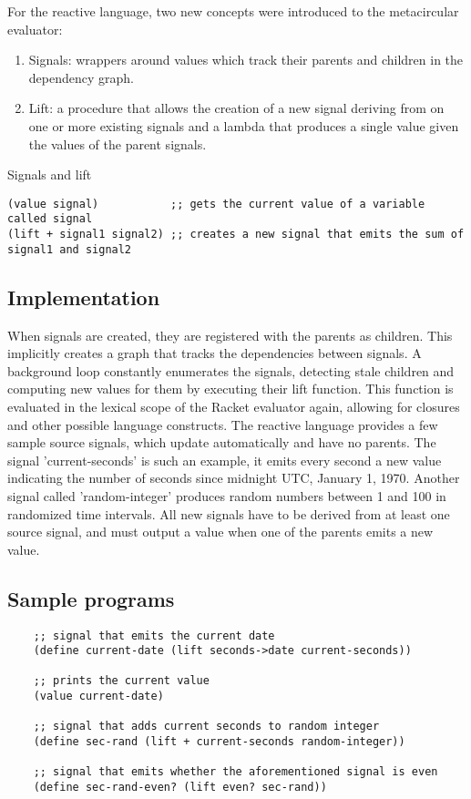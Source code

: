 For the reactive language, two new concepts were introduced to the metacircular evaluator:

\begin{enumerate}
	\item Signals: wrappers around values which track their parents and children in the dependency graph. 
	\item Lift: a procedure that allows the creation of a new signal deriving from on one or more existing signals and a lambda that produces a single value given the values of the parent signals.
\end{enumerate}

Signals and lift
\begin{lstlisting}
(value signal)           ;; gets the current value of a variable called signal
(lift + signal1 signal2) ;; creates a new signal that emits the sum of signal1 and signal2
\end{lstlisting}

\newpage
\subsection{Implementation}

When signals are created, they are registered with the parents as children. This implicitly creates a graph that tracks the dependencies between signals. A background loop constantly enumerates the signals, detecting stale children and computing new values for them by executing their lift function. This function is evaluated in the lexical scope of the Racket evaluator again, allowing for closures and other possible language constructs. 
The reactive language provides a few sample source signals, which update automatically and have no parents. The signal 'current-seconds' is such an example, it emits every second a new value indicating the number of seconds since midnight UTC, January 1, 1970. Another signal called 'random-integer' produces random numbers between 1 and 100 in randomized time intervals. 
All new signals have to be derived from at least one source signal, and must output a value when one of the parents emits a new value.

\subsection{Sample programs}

\begin{lstlisting}
	;; signal that emits the current date
	(define current-date (lift seconds->date current-seconds)) 
	
	;; prints the current value
	(value current-date)       
	
	;; signal that adds current seconds to random integer                                
	(define sec-rand (lift + current-seconds random-integer))  
	
	;; signal that emits whether the aforementioned signal is even
	(define sec-rand-even? (lift even? sec-rand))			   
\end{lstlisting}




